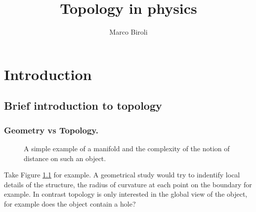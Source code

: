 \documentclass[10pt,a4paper]{book}
\author{Marco Biroli}
\title{Topology in physics}
\begin{document}
\maketitle

\chapter{Introduction}
\section{Brief introduction to topology}
\subsection{Geometry vs Topology.}

\begin{figure}[h]
\label{ex:1}
\centering
{}
\caption{A simple example of a manifold and the complexity of the notion of distance on such an object. }
\end{figure}
Take Figure \ref{ex:1} for example. A geometrical study would try to indentify local details of the structure, the radius of curvature at each point on the boundary for example. In contrast topology is only interested in the global view of the object, for example does the object contain a hole? 
\end{document}

